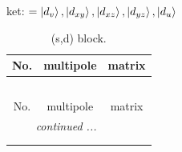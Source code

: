 \documentclass[fleqn,8pt,landscape]{jsarticle}
\begin{document}
\noindent
ket: $=\ket{d_{v}}, \ket{d_{xy}}, \ket{d_{xz}}, \ket{d_{yz}}, \ket{d_{u}}$
\renewcommand{\arraystretch}{1.6}
\begin{longtable}{ccc}
\caption{(s,d) block.}
 \\
 \hline \hline
No. & multipole & matrix \\ \hline \endfirsthead

\multicolumn{2}{l}{\tablename\ \thetable{}} \\
 \hline \hline
No. & multipole & matrix \\ \hline \endhead

 \hline \hline
\multicolumn{2}{r}{\footnotesize\it continued ...} \\ \endfoot

 \hline \hline
\multicolumn{2}{r}{} \\ \endlastfoot


\end{longtable}
\end{document}
